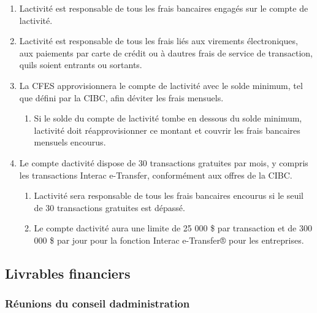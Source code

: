 \begin{enumerate}
 \item
  L\textquotesingle activité est responsable de tous les frais bancaires engagés sur le compte de l\textquotesingle activité.
 \item
  L\textquotesingle activité est responsable de tous les frais liés aux virements électroniques, aux paiements par carte de crédit ou à d\textquotesingle autres frais de service de transaction, qu\textquotesingle ils soient entrants ou sortants.
 \item
  La CFES approvisionnera le compte de l\textquotesingle activité avec le solde minimum, tel que défini par la CIBC, afin d\textquotesingle éviter les frais mensuels.

  \begin{enumerate}
   \item
    Si le solde du compte de l\textquotesingle activité tombe en dessous du solde minimum, l\textquotesingle activité doit réapprovisionner ce montant et couvrir les frais bancaires mensuels encourus.
  \end{enumerate}
 \item
  Le compte d\textquotesingle activité dispose de 30 transactions gratuites par mois, y compris les transactions Interac e-Transfer, conformément aux offres de la CIBC.

  \begin{enumerate}
   \item
    L\textquotesingle activité sera responsable de tous les frais bancaires encourus si le seuil de 30 transactions gratuites est dépassé.
   \item
    Le compte d\textquotesingle activité aura une limite de 25 000 \$ par transaction et de 300 000 \$ par jour pour la fonction Interac e-Transfer® pour les entreprises.
  \end{enumerate}
\end{enumerate}

\subsection{Livrables financiers}
\label{resultats-financiers-attendus}

\subsubsection{Réunions du conseil d\textquotesingle administration}
\label{reunions-du-conseil-dadministration-financiers}

